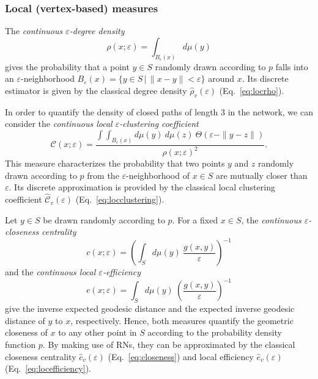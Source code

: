\documentclass[graybox]{svmult}
\begin{document}
\subsubsection{Local (vertex-based) measures}

The \emph{continuous $\varepsilon$-degree density}
\begin{equation}
\rho(x;\varepsilon)=\int_{B_{\varepsilon}(x)} d\mu(y)
\end{equation}
\noindent
gives the probability that a point $y\in S$ randomly drawn according to $p$ falls into an $\varepsilon$-neighborhood $B_{\varepsilon}(x)=\{y\in S\,|\, \|x-y\|<\varepsilon\}$ around $x$. Its discrete estimator is given by the classical degree density $\hat{\rho}_v(\varepsilon)$ (Eq.~\ref{eq:locrho}).

In order to quantify the density of closed paths of length 3 in the network, we can consider the \emph{continuous local $\varepsilon$-clustering coefficient}
\begin{equation}
\mathcal{C}(x;\varepsilon)=\frac{\int\int_{B_{\varepsilon}(x)} d\mu(y)\ d\mu(z)\ \Theta(\varepsilon-\|y-z\|)}{\rho(x;\varepsilon)^2}.
\end{equation}
\noindent
This measure characterizes the probability that two points $y$ and $z$ randomly drawn according to $p$ from the $\varepsilon$-neighborhood of $x\in S$ are mutually closer than $\varepsilon$. Its discrete approximation is provided by the classical local clustering coefficient $\hat{\mathcal{C}}_v(\varepsilon)$ (Eq.~\ref{eq:locclustering}).

Let $y\in S$ be drawn randomly according to $p$. For a fixed $x\in S$, the \emph{continuous $\varepsilon$-closeness centrality}
\begin{equation}
c(x;\varepsilon)=\left(\int_S d\mu(y)\ \frac{g(x,y)}{\varepsilon}\right)^{-1}
\end{equation}
\noindent
and the \emph{continuous local $\varepsilon$-efficiency} 
\begin{equation}
e(x;\varepsilon)=\int_S d\mu(y)\ \left(\frac{g(x,y)}{\varepsilon}\right)^{-1}
\end{equation}
\noindent
give the inverse expected geodesic distance and the expected inverse geodesic distance of $y$ to $x$, respectively. Hence, both measures quantify the geometric closeness of $x$ to any other point in $S$ according to the probability density function $p$. By making use of RNs, they can be approximated by the classical closeness centrality $\hat{c}_v(\varepsilon)$ (Eq.~\ref{eq:closeness}) and local efficiency $\hat{e}_v(\varepsilon)$ (Eq.~\ref{eq:locefficiency}).
\end{document}
